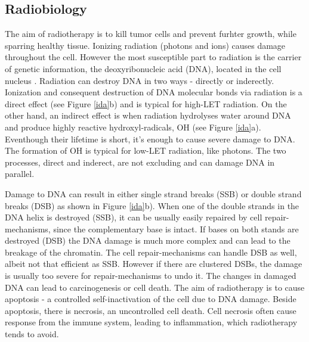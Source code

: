\documentclass[type=dr, dr=rernat, accentcolor=tud7b,colorbacktitle, bigchapter, openright, twoside, 12pt ]{tudthesis}
\begin{document}
\subsection{Radiobiology}

The aim of radiotherapy is to kill tumor cells and prevent furhter growth, while sparring healthy tissue. Ionizing radiation (photons and ions) causes damage throughout the cell. However the most susceptible part to radiation is the
carrier of genetic information, the deoxyribonucleic acid (DNA), located in the cell nucleus \cite{Munro1970}. Radiation can destroy DNA in two ways - directly or inderectly. Ionization and consequent destruction of DNA molecular bonds
via radiation is a direct effect (see Figure \ref{ida}b) and is typical for high-LET radiation. On the other hand, an indirect effect is when radiation hydrolyses water around DNA and produce highly reactive hydroxyl-radicals, OH 
(see Figure \ref{ida}a). Eventhough their lifetime is short, it's enough to cause severe damage to DNA. The formation of OH is typical for low-LET radiation, like photons. The two processes, direct and inderect, are not 
excluding and can damage DNA in parallel.

Damage to DNA can result in either single strand breaks (SSB) or double strand breaks (DSB) as  shown in Figure \ref{ida}b). When one of the double strands in the DNA helix is destroyed (SSB), it can be usually easily repaired by cell 
repair-mechanisms, since the complementary base is intact. If bases on both stands are destroyed (DSB) the DNA damage is much more complex and can lead to the breakage of the chromatin. The cell repair-mechanisms can handle DSB as well, 
albeit not that efficient as SSB. However if there are clustered DSBs, the damage is usually too severe for repair-mechanisms to undo it. The changes in damaged DNA can lead to carcinogenesis or cell death. The aim of radiotherapy is to 
cause apoptosis - a controlled self-inactivation of the cell due to DNA damage. Beside apoptosis, there is necrosis, an uncontrolled cell death. Cell necrosis often cause response from the immune system, leading to inflammation, which
radiotherapy tends to avoid.
\end{document}
